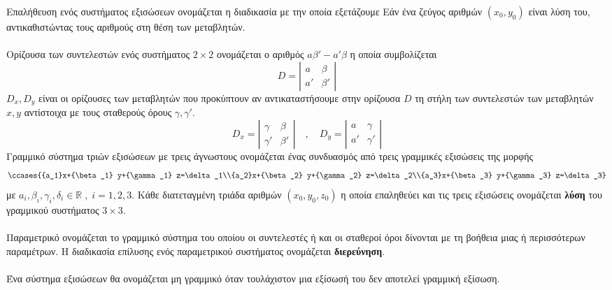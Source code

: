 \documentclass[twoside,nofonts,internet,shmeiwseis]{thewria}
\begin{document}
Επαλήθευση ενός συστήματος εξισώσεων ονομάζεται η διαδικασία με την οποία εξετάζουμε Εάν ένα ζεύγος αριθμών $ \left(x_0,y_0\right)  $ είναι λύση του, αντικαθιστώντας τους αριθμούς στη θέση των μεταβλητών.\\\\
Ορίζουσα των συντελεστών ενός συστήματος $ 2\times2 $ ονομάζεται ο αριθμός $ a\beta'-a'\beta $ η οποία συμβολίζεται
\[ D=\left|\begin{array}{cc}
a & \beta \\ 
a' & \beta'
\end{array}  \right|  \]
$ D_x,D_y $ είναι οι ορίζουσες των μεταβλητών που προκύπτουν αν αντικαταστήσουμε στην ορίζουσα $ D $ τη στήλη των συντελεστών των μεταβλητών $ x,y $ αντίστοιχα με τους σταθερούς όρους $ \gamma,\gamma' $.
\[ D_x=\left|\begin{array}{cc}
\gamma & \beta \\ 
\gamma' & \beta'
\end{array}  \right|\quad,\quad D_y=\left|\begin{array}{cc}
a & \gamma \\ 
a' & \gamma'
\end{array}  \right| \]
Γραμμικό σύστημα τριών εξισώσεων με τρεις άγνωστους ονομάζεται ένας συνδυασμός από τρεις γραμμικές εξισώσεις της μορφής
\[ \ccases{{a_1}x+{\beta_1} y+{\gamma_1} z=\delta_1\\{a_2}x+{\beta_2} y+{\gamma_2} z=\delta_2\\{a_3}x+{\beta_3} y+{\gamma_3} z=\delta_3} \]
με $ a_i,\beta_i,\gamma_i,\delta_i\in\mathbb{R}\;,\;i=1,2,3 $. Κάθε διατεταγμένη τριάδα αριθμών $ \left( x_0,y_0,z_0\right)  $ η οποία επαληθεύει και τις τρεις εξισώσεις ονομάζεται \textbf{λύση} του γραμμικού συστήματος $ 3\times3 $.\\\\
Παραμετρικό ονομάζεται το γραμμικό σύστημα του οποίου οι συντελεστές ή και οι σταθεροί όροι δίνονται με τη βοήθεια μιας ή περισσότερων παραμέτρων. Η διαδικασία επίλυσης ενός παραμετρικού συστήματος ονομάζεται \textbf{διερεύνηση}.
\\\\
Ένα σύστημα εξισώσεων θα ονομάζεται μη γραμμικό όταν τουλάχιστον μια εξίσωσή του δεν αποτελεί γραμμική εξίσωση.\\\\
\end{document}
